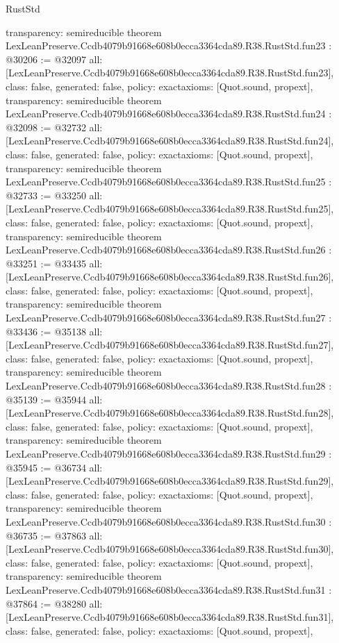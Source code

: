 \begin{lexlean}{RustStd}
\begin{coremodule}
{  transparency: semireducible
}
theorem LexLeanPreserve.Ccdb4079b91668e608b0ecca3364cda89.R38.RustStd.fun23 : @30206 := @32097 {
  all: [LexLeanPreserve.Ccdb4079b91668e608b0ecca3364cda89.R38.RustStd.fun23],
  class: false,
  generated: false,
  policy: exact{axioms: [Quot.sound, propext]},
  transparency: semireducible
}
theorem LexLeanPreserve.Ccdb4079b91668e608b0ecca3364cda89.R38.RustStd.fun24 : @32098 := @32732 {
  all: [LexLeanPreserve.Ccdb4079b91668e608b0ecca3364cda89.R38.RustStd.fun24],
  class: false,
  generated: false,
  policy: exact{axioms: [Quot.sound, propext]},
  transparency: semireducible
}
theorem LexLeanPreserve.Ccdb4079b91668e608b0ecca3364cda89.R38.RustStd.fun25 : @32733 := @33250 {
  all: [LexLeanPreserve.Ccdb4079b91668e608b0ecca3364cda89.R38.RustStd.fun25],
  class: false,
  generated: false,
  policy: exact{axioms: [Quot.sound, propext]},
  transparency: semireducible
}
theorem LexLeanPreserve.Ccdb4079b91668e608b0ecca3364cda89.R38.RustStd.fun26 : @33251 := @33435 {
  all: [LexLeanPreserve.Ccdb4079b91668e608b0ecca3364cda89.R38.RustStd.fun26],
  class: false,
  generated: false,
  policy: exact{axioms: [Quot.sound, propext]},
  transparency: semireducible
}
theorem LexLeanPreserve.Ccdb4079b91668e608b0ecca3364cda89.R38.RustStd.fun27 : @33436 := @35138 {
  all: [LexLeanPreserve.Ccdb4079b91668e608b0ecca3364cda89.R38.RustStd.fun27],
  class: false,
  generated: false,
  policy: exact{axioms: [Quot.sound, propext]},
  transparency: semireducible
}
theorem LexLeanPreserve.Ccdb4079b91668e608b0ecca3364cda89.R38.RustStd.fun28 : @35139 := @35944 {
  all: [LexLeanPreserve.Ccdb4079b91668e608b0ecca3364cda89.R38.RustStd.fun28],
  class: false,
  generated: false,
  policy: exact{axioms: [Quot.sound, propext]},
  transparency: semireducible
}
theorem LexLeanPreserve.Ccdb4079b91668e608b0ecca3364cda89.R38.RustStd.fun29 : @35945 := @36734 {
  all: [LexLeanPreserve.Ccdb4079b91668e608b0ecca3364cda89.R38.RustStd.fun29],
  class: false,
  generated: false,
  policy: exact{axioms: [Quot.sound, propext]},
  transparency: semireducible
}
theorem LexLeanPreserve.Ccdb4079b91668e608b0ecca3364cda89.R38.RustStd.fun30 : @36735 := @37863 {
  all: [LexLeanPreserve.Ccdb4079b91668e608b0ecca3364cda89.R38.RustStd.fun30],
  class: false,
  generated: false,
  policy: exact{axioms: [Quot.sound, propext]},
  transparency: semireducible
}
theorem LexLeanPreserve.Ccdb4079b91668e608b0ecca3364cda89.R38.RustStd.fun31 : @37864 := @38280 {
  all: [LexLeanPreserve.Ccdb4079b91668e608b0ecca3364cda89.R38.RustStd.fun31],
  class: false,
  generated: false,
  policy: exact{axioms: [Quot.sound, propext]},
}
\end{coremodule}
\end{lexlean}
